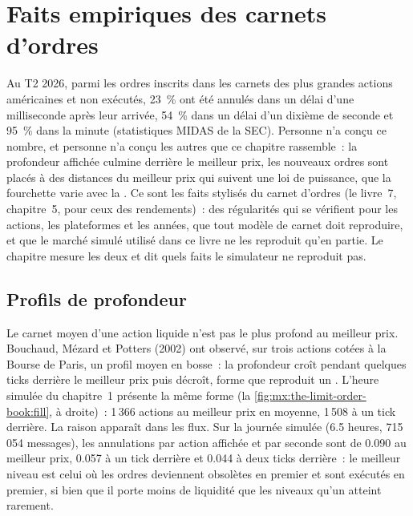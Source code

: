\chapter{Faits empiriques des carnets d'ordres}\label{ch:mx:empirical-facts-of-order-books}

Au T2 2026, parmi les ordres inscrits dans les carnets des plus grandes actions américaines et non exécutés, 23~\% ont été annulés dans un
délai d'une milliseconde après leur arrivée, 54~\% dans un délai d'un dixième de seconde et 95~\% dans la minute (statistiques MIDAS de la SEC). Personne n'a conçu ce
nombre, et personne n'a conçu les autres que ce chapitre rassemble~: la profondeur affichée culmine derrière le meilleur prix, les nouveaux ordres sont placés
à des distances du meilleur prix qui suivent une loi de puissance, que la fourchette varie avec la . Ce sont les
faits stylisés du carnet d'ordres (le livre~7, chapitre~5, pour ceux des rendements)~: des régularités qui se vérifient pour les actions, les plateformes et les années, que tout modèle
de carnet doit reproduire, et que le marché simulé utilisé dans ce livre ne les reproduit qu'en partie. Le chapitre mesure les deux et dit quels faits
le simulateur ne reproduit pas.

\section{Profils de profondeur}

Le carnet moyen d'une action liquide n'est pas le plus profond au meilleur prix. Bouchaud, Mézard et Potters (2002) ont observé, sur trois actions cotées à la Bourse de Paris, un
profil moyen en bosse~: la profondeur croît pendant quelques ticks derrière le meilleur prix puis décroît, forme que reproduit un .
L'heure simulée du chapitre~1 présente la même forme (la \cref{fig:mx:the-limit-order-book:fill}, à droite)~: 1\,366 actions au meilleur prix en moyenne, 1\,508 à un
tick derrière. La raison apparaît dans les flux. Sur la journée simulée (6.5 heures, 715\,054 messages), les annulations par action affichée et par seconde
sont de 0.090 au meilleur prix, 0.057 à un tick derrière et 0.044 à deux ticks derrière~: le meilleur niveau est celui où les ordres deviennent obsolètes en premier et sont exécutés en premier, si bien que
il porte moins de liquidité que les niveaux qu'un  atteint rarement.


